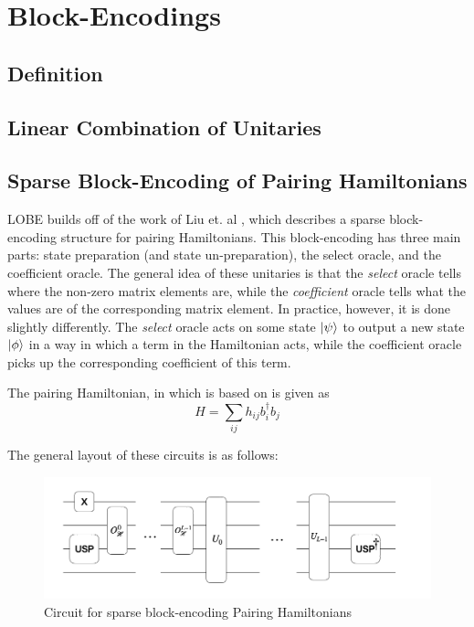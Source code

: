 \section{Block-Encodings}
\label{sec:block-encoding}

\subsection{Definition}


\subsection{Linear Combination of Unitaries}
\label{subsec:lcu}

\subsection{Sparse Block-Encoding of Pairing Hamiltonians}
\label{subsec:sparse-be}
LOBE builds off of the work of Liu et. al \cite{liu2024efficient}, which describes a sparse block-encoding structure for pairing Hamiltonians. This block-encoding has three main parts: state preparation (and state un-preparation), the select oracle, and the coefficient oracle. The general idea of these unitaries is that the \textit{select} oracle tells where the non-zero matrix elements are, while the \textit{coefficient} oracle tells what the values are of the corresponding matrix element. 
In practice, however, it is done slightly differently. The \textit{select} oracle acts on some state $\ket{\psi}$ to output a new state $\ket{\phi}$ in a way in which a term in the Hamiltonian acts, while the coefficient oracle picks up the corresponding coefficient of this term. 

The pairing Hamiltonian, in which \cite{liu2024efficient} is based on is given as 
\begin{equation}
    H = \sum_{ij}h_{ij}b^\dagger_i b_j
\end{equation}

The general layout of these circuits is as follows: 

\begin{figure}[h]
    \includegraphics[width = \linewidth]{figures/SBE.png}
    \caption{Circuit for sparse block-encoding Pairing Hamiltonians}
\end{figure}

